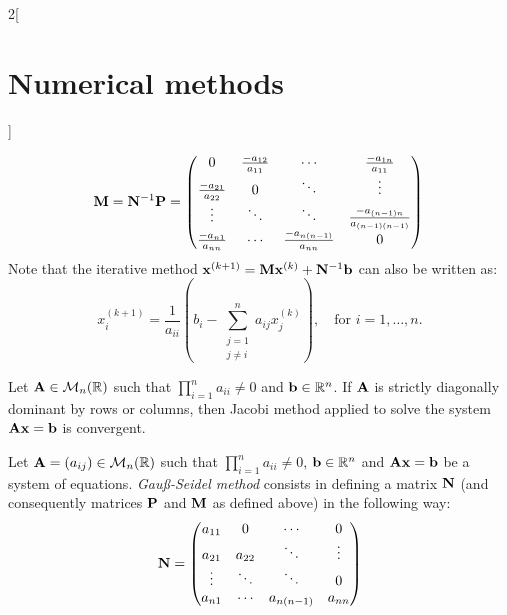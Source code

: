 \documentclass[../../../main.tex]{subfiles}
\begin{document}
\begin{multicols}{2}[\section{Numerical methods}]
\begin{definition}
    \begin{equation*}
        \vb{M}=\vb{N}^{-1}\vb{P}=
        \begin{pmatrix}
            0 & \frac{-a_{12}}{a_{11}} & \cdots & \frac{-a_{1n}}{a_{11}}\\
            \frac{-a_{21}}{a_{22}} & 0 & \ddots & \vdots\\
            \vdots & \ddots & \ddots & \frac{-a_{(n-1)n}}{a_{(n-1)(n-1)}}\\
            \frac{-a_{n1}}{a_{nn}} & \cdots & \frac{-a_{n(n-1)}}{a_{nn}} & 0
        \end{pmatrix}\\
    \end{equation*}
    Note that the iterative method $\vb{x}^{(k+1)}=\vb{M}\vb{x}^{(k)}+\vb{N}^{-1}\vb{b}$ can also be written as: $$x_i^{(k+1)}=\frac{1}{a_{ii}}\left(b_i-\sum_{\substack{j=1\\j\ne i}}^na_{ij}x_j^{(k)}\right),\quad\text{for }i=1,\ldots,n.$$
\end{definition}
\begin{theorem}
    Let $\vb{A}\in\mathcal{M}_n(\mathbb{R})$ such that $\prod_{i=1}^na_{ii}\ne 0$ and $\vb{b}\in\mathbb{R}^n$. If $\vb{A}$ is strictly diagonally dominant by rows or columns, then Jacobi method applied to solve the system $\vb{A}\vb{x}=\vb{b}$ is convergent.
\end{theorem}
\begin{definition}
    Let $\vb{A}=(a_{ij})\in\mathcal{M}_n(\mathbb{R})$ such that $\prod_{i=1}^na_{ii}\ne 0$, $\vb{b}\in\mathbb{R}^n$ and $\vb{A}\vb{x}=\vb{b}$ be a system of equations. \textit{Gau\ss-Seidel method} consists in defining a matrix $\vb{N}$ (and consequently matrices $\vb{P}$ and $\vb{M}$ as defined above) in the following way:
    \begin{equation*}
        \vb{N}=
        \begin{pmatrix}
            a_{11} & 0 & \cdots & 0\\
            a_{21} & a_{22} & \ddots & \vdots\\
            \vdots & \ddots & \ddots & 0\\
            a_{n1} & \cdots & a_{n(n-1)} & a_{nn}
        \end{pmatrix}
    \end{equation*}
    \begin{equation*}

\end{equation*}
\end{definition}
\end{multicols}
\end{document}
